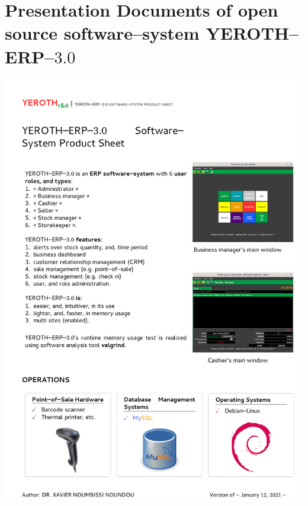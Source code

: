 \chapter{Presentation Documents of open source software--system YEROTH--ERP--$3.0$}

\newpage

\includegraphics[scale=0.93]{../yeroth-product-sheet/yeroth-erp-3-0-product-sheet.pdf}

